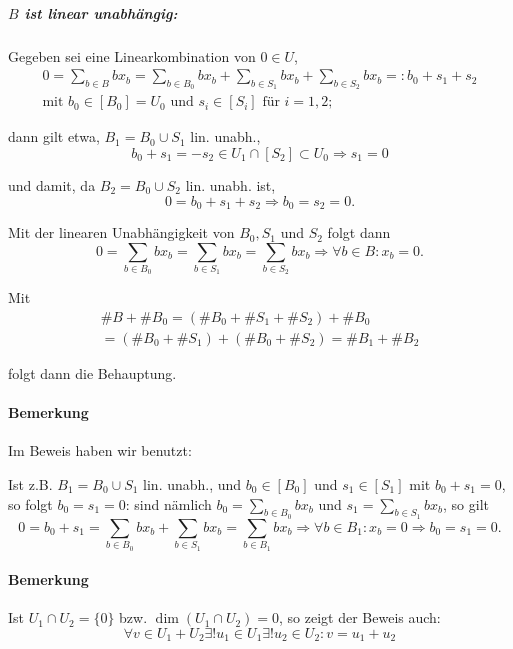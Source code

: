 \subparagraph{$ B $ ist linear unabhängig:}
	Gegeben sei eine Linearkombination von $ 0\in U $,
		\begin{gather*}
		0 = \sum_{b\in B}bx_b = \sum_{b\in B_0}bx_b + \sum_{b\in S_1}bx_b + \sum_{b\in S_2}bx_b =: b_0 + s_1+ s_2\\
		\text{mit } b_0\in [B_0] = U_0 \text{ und } s_i\in [S_i] \text{ für } i= 1,2;
		\end{gather*}
		
	dann gilt etwa, $ B_1 = B_0 \cup S_1 $ lin. unabh.,
		\begin{equation*}
		b_0+s_1 = -s_2 \in U_1\cap [S_2]\subset U_0 \Rightarrow s_1 = 0
		\end{equation*}
		
	und damit, da $ B_2 = B_0 \cup S_2 $ lin. unabh. ist,
		\begin{equation*}
		0 = b_0 + s_1 + s_2 \Rightarrow b_0=s_2 = 0.
		\end{equation*}
	
	Mit der linearen Unabhängigkeit von $ B_0, S_1 $ und $ S_2 $ folgt dann
		\begin{equation*}
		0 = \sum_{b\in B_0}bx_b = \sum_{b\in S_1}bx_b = \sum_{b\in S_2}bx_b \Rightarrow \forall b\in B: x_b = 0.
		\end{equation*}
	
	Mit
		\begin{gather*}
		\#B + \#B_0 = (\#B_0 + \#S_1 + \#S_2) + \#B_0\\
		= (\#B_0+\#S_1)+(\#B_0 + \#S_2) = \#B_1+\#B_2
		\end{gather*}
	
	folgt dann die Behauptung.

\paragraph{Bemerkung}
	Im Beweis haben wir benutzt: 
	
	Ist z.B. $ B_1 = B_0\cup S_1 $ lin. unabh., und $ b_0\in [B_0] $ und $ s_1\in [S_1] $ mit $ b_0 + s_1 = 0 $, so folgt $ b_0 = s_1 = 0 $:
	sind nämlich $ b_0 = \sum_{b\in B_0} bx_b $ und $ s_1 = \sum_{b\in S_1}bx_b $, so gilt 
		\begin{equation*}
		0 = b_0+s_1 = \sum_{b\in B_0} bx_b+\sum_{b\in S_1} bx_b = \sum_{b\in B_1} bx_b \Rightarrow \forall b\in B_1: x_b = 0\Rightarrow b_0 = s_1 = 0.
		\end{equation*}

\paragraph{Bemerkung}
	Ist $ U_1\cap U_2 = \{0\} $ bzw. $ \dim (U_1\cap U_2)  = 0 $, so zeigt der Beweis auch:
		\begin{equation*}
		\forall v\in U_1+U_2\exists ! u_1 \in U_1\exists ! u_2\in U_2: v= u_1+u_2
		\end{equation*}

